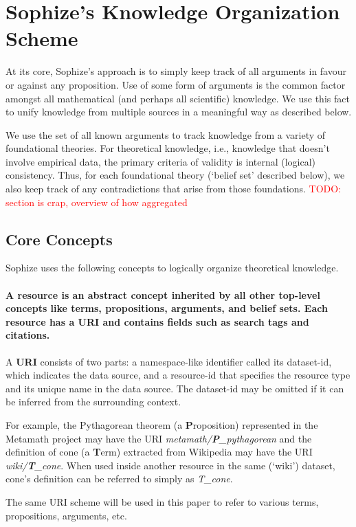 \documentclass[a4paper]{article}
\newcommand\todo[1]{\textcolor{red}{TODO: #1}}
\begin{document}
\section{Sophize's Knowledge Organization Scheme}
At its core, Sophize's approach is to simply keep track of all arguments in favour or against any proposition. Use of some form of arguments is the common factor amongst all mathematical (and perhaps all scientific) knowledge. We use this fact to unify knowledge from multiple sources in a meaningful way as described below.

We use the set of all known arguments to track knowledge from a variety of foundational theories. For theoretical knowledge, i.e., knowledge that doesn't involve empirical data, the primary criteria of validity is internal (logical) consistency. Thus, for each foundational theory (`belief set' described below), we also keep track of any contradictions that arise from those foundations.
\todo{section is crap, overview of how aggregated}

\subsection{Core Concepts}
Sophize uses the following concepts to logically organize theoretical knowledge.

\paragraph{A \textbf{resource} is an abstract concept inherited by all other top-level concepts like terms, propositions, arguments, and belief sets. Each resource has a URI and contains fields such as search tags and citations.}

A \textbf{URI} consists of two parts: a namespace-like identifier called its dataset-id, which indicates the data source, and a resource-id that specifies the resource type and its unique name in the data source. The dataset-id may be omitted if it can be inferred from the surrounding context.

For example, the Pythagorean theorem (a \textbf{P}roposition) represented in the Metamath project may have the URI \emph{metamath/\textbf{P}\_pythagorean} and the definition of cone (a \textbf{T}erm) extracted from Wikipedia may have the URI \emph{wiki/\textbf{T}\_cone}. When used inside another resource in the same (`wiki') dataset, cone's definition can be referred to simply as \emph{T\_cone}.

The same URI scheme will be used in this paper to refer to various terms, propositions, arguments, etc.
\end{document}
